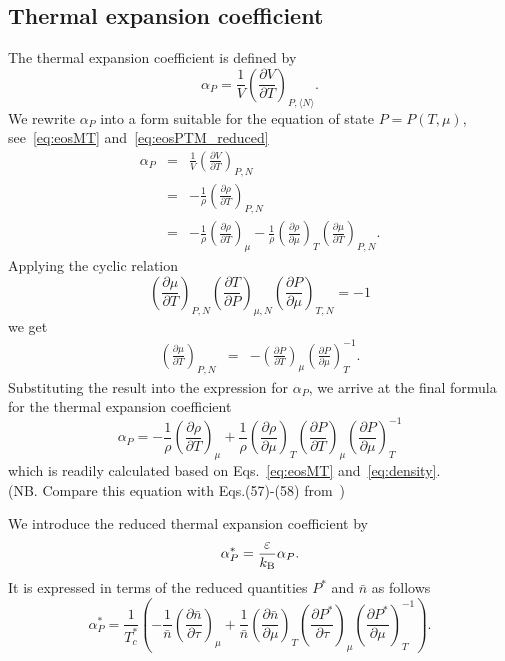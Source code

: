 \documentclass[12pt]{article}
\begin{document}
	\subsection{Thermal expansion coefficient}
	The thermal expansion coefficient is defined by
	\begin{equation}
		\alpha_P = \frac{1}{V}\left(\frac{\partial V}{\partial T}\right)_{P,\langle N\rangle}.
	\end{equation}
	We rewrite $\alpha_P$ into a form suitable for the equation of state $P=P(T,\mu)$, see~\eqref{eq:eosMT} and~\eqref{eq:eosPTM_reduced}
	\begin{eqnarray}
		\alpha_P & = & \frac{1}{V}\left(\frac{\partial V}{\partial T}\right)_{P, N}
		\nonumber\\
		\label{eq:alpha_vs_rho}
		& = & -\frac{1}{\rho} \left(\frac{\partial \rho}{\partial T}\right)_{P, N}
		\\
		& = & -\frac{1}{\rho} \left(\frac{\partial \rho}{\partial T}\right)_{\mu} 
		 - \frac{1}{\rho} \left(\frac{\partial \rho}{\partial \mu}\right)_{T}
		 \left(\frac{\partial \mu}{\partial T}\right)_{P, N}.
	\end{eqnarray}
	Applying the cyclic relation
	\begin{equation*}
		\left(\frac{\partial \mu}{\partial T}\right)_{P, N}
		\left(\frac{\partial T}{\partial P}\right)_{\mu, N}
		\left(\frac{\partial P}{\partial \mu}\right)_{T, N}
		= -1
	\end{equation*}
	we get
	\begin{eqnarray*}
		\left(\frac{\partial \mu}{\partial T}\right)_{P, N} & = & 
		- \left(\frac{\partial P}{\partial T}\right)_{\mu}
		\left(\frac{\partial P}{\partial \mu}\right)^{-1}_{T}.
	\end{eqnarray*}
	Substituting the result into the expression for $\alpha_P$, we arrive at the final formula for the thermal expansion coefficient
	\begin{equation}
		\alpha_P = -\frac{1}{\rho}\left(\frac{\partial \rho}{\partial T}\right)_{\mu}
		+ \frac{1}{\rho} \left(\frac{\partial \rho}{\partial \mu}\right)_{T}
		\left(\frac{\partial P}{\partial T}\right)_{\mu}
		\left(\frac{\partial P}{\partial \mu}\right)^{-1}_{T}
	\end{equation}
	which is readily calculated based on Eqs.~\eqref{eq:eosMT} and~\eqref{eq:density}.\\
	(NB. Compare this equation with Eqs.(57)-(58) from~\cite{StrokerMeier2021})
	
	We introduce the reduced thermal expansion coefficient by
	\begin{equation}
		\alpha^*_P = \frac{\varepsilon}{k_{\rm B}} \alpha_P.
	\end{equation}
	It is expressed in terms of the reduced quantities $P^*$ and $\bar{n}$ as follows
	\begin{equation}
		\alpha^*_P = \frac{1}{T^*_c}
		\left( 
		-\frac{1}{\bar{n}}\left(\frac{\partial \bar{n}}{\partial \tau}\right)_{\mu}
		+ \frac{1}{\bar{n}} \left(\frac{\partial \bar{n}}{\partial \mu}\right)_{T}
		\left(\frac{\partial P^*}{\partial \tau}\right)_{\mu}
		\left(\frac{\partial P^*}{\partial \mu}\right)^{-1}_{T} 
		\right).
	\end{equation}
	
\end{document}
